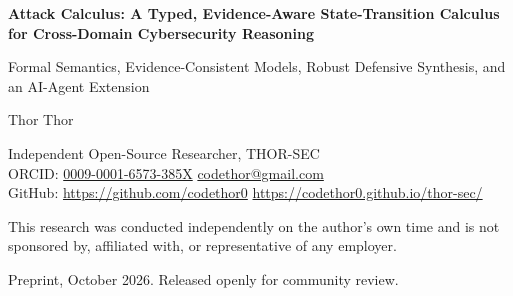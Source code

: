 \documentclass[11pt,letterpaper]{article}
\newcommand{\authorname}{Thor Thor}
\newcommand{\orcidid}{0009-0001-6573-385X}
\theoremstyle{definition}
\begin{document}
\begin{center}
{\LARGE\bfseries Attack Calculus: A Typed, Evidence-Aware State-Transition Calculus for Cross-Domain Cybersecurity Reasoning\par}
\vspace{0.6em}
{\large Formal Semantics, Evidence-Consistent Models, Robust Defensive Synthesis, and an AI-Agent Extension\par}
\vspace{1.0em}
{\large \authorname\par}
\vspace{0.3em}
{\small Independent Open-Source Researcher, THOR-SEC\\
ORCID: \href{https://orcid.org/\orcidid}{\orcidid} \quad \url{codethor@gmail.com}\\
GitHub: \url{https://github.com/codethor0} \quad \url{https://codethor0.github.io/thor-sec/}\par}
\vspace{0.3em}
{\small This research was conducted independently on the author's own time and is not sponsored by, affiliated with, or representative of any employer.\par}
\vspace{0.3em}
{\small Preprint, October 2026. Released openly for community review.\par}
\end{center}
\end{document}
